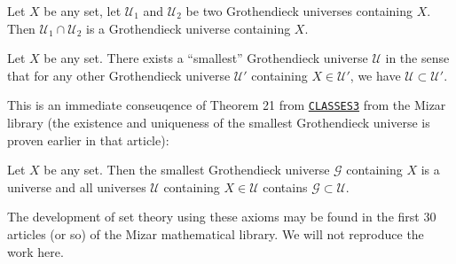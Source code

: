 \begin{lemma}\label{set:tg-000D}%
Let $X$ be any set, let $\mathcal{U}_{1}$ and $\mathcal{U}_{2}$ be two
Grothendieck universes containing $X$. Then
$\mathcal{U}_{1}\cap\mathcal{U}_{2}$ is a Grothendieck universe
containing $X$.
\end{lemma}

\begin{theorem}\label{set:tg-000C}%
Let $X$ be any set. There exists a ``smallest'' Grothendieck universe
$\mathcal{U}$ in the sense that for any other Grothendieck universe
$\mathcal{U}'$ containing $X\in\mathcal{U}'$, we have
$\mathcal{U}\subset\mathcal{U}'$.
\end{theorem}

This is an immediate conseuqence of Theorem 21 from \href{https://mizar.uwb.edu.pl/version/current/html/classes3.html\#T21}{\texttt{CLASSES3}}
from the Mizar library (the existence and uniqueness of the smallest
Grothendieck universe is proven earlier in that article):

\begin{theorem}
Let $X$ be any set. Then the smallest Grothendieck universe
$\mathcal{G}$ containing $X$ is a universe and all universes
$\mathcal{U}$ containing $X\in\mathcal{U}$ contains
$\mathcal{G}\subset\mathcal{U}$.
\end{theorem}

\begin{node}\label{tg-000A}%
The development of set theory using these axioms may be found in the
first 30 articles (or so) of the Mizar mathematical library. We will not
reproduce the work here.
\end{node}

